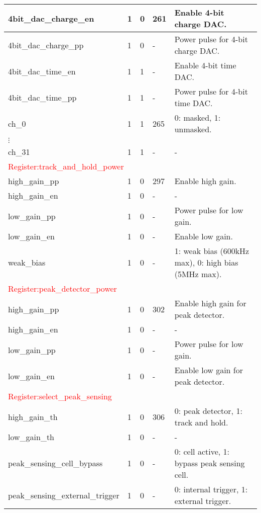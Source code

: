 \begin{longtable}{|p{6cm}|p{1cm}|p{1.4cm}|p{1.8cm}|p{5cm}|}
4bit\_dac\_charge\_en          & 1  & 0 & 261   & Enable 4-bit charge DAC. \\ \hline
4bit\_dac\_charge\_pp          & 1  & 0 & -   & Power pulse for 4-bit charge DAC. \\ \hline
4bit\_dac\_time\_en            & 1  & 1 & -   & Enable 4-bit time DAC. \\ \hline
4bit\_dac\_time\_pp            & 1  & 1 & -   & Power pulse for 4-bit time DAC. \\ \hline

 ch\_0 & 1  & 1 & 265 & 0: masked, 1: unmasked. \\ \hline
 $\vdots$ & &   &  & \\ \hline %
ch\_31 & 1  & 1 & - & - \\ \hline

\multicolumn{5}{|l|}{\textcolor{red}{Register:track\_and\_hold\_power}} \\ \hline
high\_gain\_pp & 1  & 0 & 297 & Enable high gain. \\ \hline
 high\_gain\_en & 1  & 0 & -   & - \\ \hline
 low\_gain\_pp  & 1  & 0 & -   & Power pulse for low gain. \\ \hline
 low\_gain\_en  & 1  & 0 & -   & Enable low gain. \\ \hline
 weak\_bias     & 1  & 0 & -   & 1: weak bias (600kHz max), 0: high bias (5MHz max). \\ \hline

\multicolumn{5}{|l|}{\textcolor{red}{Register:peak\_detector\_power}} \\ \hline
 high\_gain\_pp & 1  & 0 & 302 & Enable high gain for peak detector. \\ \hline
 high\_gain\_en & 1  & 0 & - & - \\ \hline
 low\_gain\_pp  & 1  & 0 & - & Power pulse for low gain. \\ \hline
 low\_gain\_en  & 1  & 0 & - & Enable low gain for peak detector. \\ \hline

\multicolumn{5}{|l|}{\textcolor{red}{Register:select\_peak\_sensing}} \\ \hline
 high\_gain\_th & 1  & 0 & 306 & 0: peak detector, 1: track and hold. \\ \hline
 low\_gain\_th  & 1  & 0 & -   & - \\ \hline
peak\_sensing\_cell\_bypass          & 1  & 0 & -   & 0: cell active, 1: bypass peak sensing cell. \\ \hline
peak\_sensing\_external\_trigger     & 1  & 0 & -   & 0: internal trigger, 1: external trigger. \\ \hline


\end{longtable}
